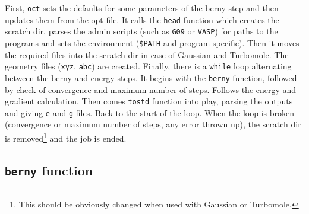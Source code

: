 \documentclass[12pt,a4]{article}
\newcommand{\ttt}{\texttt}
\begin{document}
First, \ttt{oct} sets the defaults for some parameters of the berny step and then updates them from the opt file. It calls the \ttt{head} function which creates the scratch dir, parses the admin scripts (such as \ttt{G09} or \ttt{VASP}) for paths to the programs and sets the environment (\ttt{\$PATH} and program specific). Then it moves the required files into the scratch dir in case of Gaussian and Turbomole. The geometry files (\ttt{xyz}, \ttt{abc}) are created. Finally, there is a \ttt{while} loop alternating between the berny and energy steps. It begins with the \ttt{berny} function, followed by check of convergence and maximum number of steps. Follows the energy and gradient calculation. Then comes \ttt{tostd} function into play, parsing the outputs and giving \ttt{e} and \ttt{g} files. Back to the start of the loop. When the loop is broken (convergence or maximum number of steps, any error thrown up), the scratch dir is removed\footnote{This should be obviously changed when used with Gaussian or Turbomole.} and the job is ended.

\subsection{\ttt{berny} function}
\end{document}
